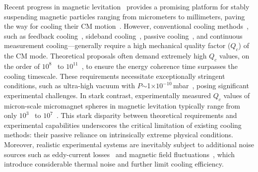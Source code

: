 \documentclass[aps, prresearch, reprint, nofootinbib, longbibliography]{revtex4-2}
\begin{document}
Recent progress in magnetic levitation~\cite{PhysRevLett.124.093602,PhysRevApplied.11.044041,PhysRevB.96.134419, PhysRevA.96.063810,levitation} provides a promising platform for stably suspending magnetic particles ranging from micrometers to millimeters, paving the way for cooling their CM motion~\cite{Pontin2023simultaneous,prr,PhysRevLett128013602}. However, conventional cooling methods~\cite{PhysRevLett128013602,PhysRevLett.126.193602,Nc580,PhysRevLett.122.123601,PhysRevLett.110.153606,PhysRevLett.117.173602}, such as feedback cooling~\cite{PhysRevResearch.6.033345,PhysRevA.103.L051701,Nc373,Nc595}, sideband cooling~\cite{ PhysRevLett.123.153601}, passive cooling~\cite{Nature7289}, and continuous measurement cooling---generally require a high mechanical quality factor (\( Q_c \)) of the CM mode. Theoretical proposals often demand extremely high \( Q_c \) values, on the order of \( 10^{8} \)~\cite{PhysRevA.108.023523} to \( 10^{11} \)~\cite{PhysRevLett128013602}, to ensure the energy coherence time surpasses the cooling timescale.
These requirements necessitate exceptionally stringent conditions, such as ultra-high vacuum with $P$$\sim$1$\times 10^{-10}$\,\si{\milli\bar}~\cite{12, 2013Thermal}, posing significant experimental challenges. %
In stark contrast, experimentally measured \( Q_c \)
values of micron-scale micromagnet spheres in magnetic levitation typically range from only $10^3$~\cite{PhysRevA.108.063511} to $10^7$~\cite{PhysRevLett.124.163604,PhysRevLett.131.043603}. 
This stark disparity between theoretical requirements and experimental capabilities underscores the critical limitation of existing cooling methods: their passive reliance on intrinsically extreme physical conditions. Moreover, realistic experimental systems are inevitably subject to additional noise sources such as eddy-current losses~\cite{PhysRevA.108.063511} and magnetic field fluctuations~\cite{PhysRevA.108.023523}, which introduce considerable thermal noise and further limit cooling efficiency.
\end{document}
